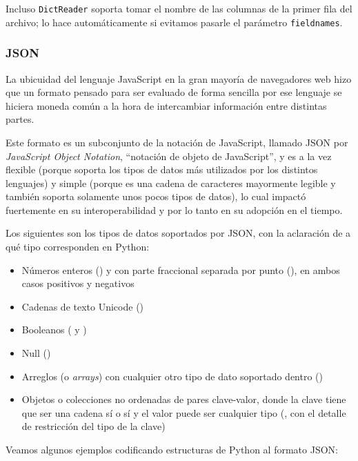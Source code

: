 
Incluso \texttt{DictReader} soporta tomar el nombre de las columnas de la primer fila del archivo; lo hace automáticamente si evitamos pasarle el parámetro \texttt{fieldnames}.


\subsubsection{JSON}

La ubicuidad del lenguaje JavaScript en la gran mayoría de navegadores web hizo que un formato pensado para ser evaluado de forma sencilla por ese lenguaje se hiciera moneda común a la hora de intercambiar información entre distintas partes.

Este formato es un subconjunto de la notación de JavaScript, llamado JSON por \textit{JavaScript Object Notation}, ``notación de objeto de JavaScript'', y es a la vez flexible (porque soporta los tipos de datos más utilizados por los distintos lenguajes) y simple (porque es una cadena de caracteres mayormente legible y también soporta solamente unos pocos tipos de datos), lo cual impactó fuertemente en su interoperabilidad y por lo tanto en su adopción en el tiempo.

Los siguientes son los tipos de datos soportados por JSON, con la aclaración de a qué tipo corresponden en Python:

\begin{itemize}
    \item Números enteros () y con parte fraccional separada por punto (), en ambos casos positivos y negativos
    \item Cadenas de texto Unicode ()
    \item Booleanos ( y )
    \item Null ()
    \item Arreglos (o \textit{arrays}) con cualquier otro tipo de dato soportado dentro ()
    \item Objetos o colecciones no ordenadas de pares clave-valor, donde la clave tiene que ser una cadena sí o sí y el valor puede ser cualquier tipo (, con el detalle de restricción del tipo de la clave)
\end{itemize}

Veamos algunos ejemplos codificando estructuras de Python al formato JSON:


